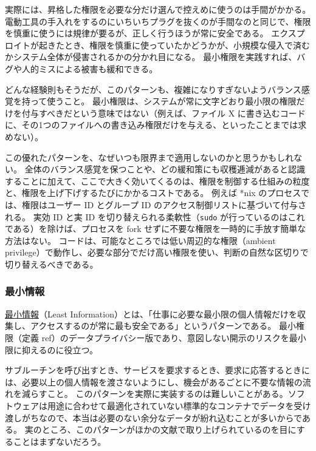 \documentclass[uplatex]{jsarticle}
\def\ref#1{ref}%
\def\label#1{}%
\begin{document}
実際には、昇格した権限を必要な分だけ選んで控えめに使うのは手間がかかる。
電動工具の手入れをするのにいちいちプラグを抜くのが手間なのと同じで、権限を慎重に使うには規律が要るが、正しく行うほうが常に安全である。
エクスプロイトが起きたとき、権限を慎重に使っていたかどうかが、小規模な侵入で済むかシステム全体が侵害されるかの分かれ目になる。
最小権限を実践すれば、バグや人的ミスによる被害も緩和できる。

\begin{rem}[最小権限とバランス]\label{rem:ch4-least-privilege-balance}
どんな経験則もそうだが、このパターンも、複雑になりすぎないようバランス感覚を持って使うこと。
最小権限は、システムが常に文字どおり最小限の権限だけを付与すべきだという意味ではない（例えば、ファイル X に書き込むコードに、その1つのファイルへの書き込み権限だけを与える、といったことまでは求めない）。

この優れたパターンを、なぜいつも限界まで適用しないのかと思うかもしれない。
全体のバランス感覚を保つことや、どの緩和策にも収穫逓減があると認識することに加えて、ここで大きく効いてくるのは、権限を制御する仕組みの粒度と、権限を上げ下げするたびにかかるコストである。
例えば *nix のプロセスでは、権限はユーザー ID とグループ ID のアクセス制御リストに基づいて付与される。
実効 ID と実 ID を切り替えられる柔軟性（\texttt{sudo} が行っているのはこれである）を除けば、プロセスを fork せずに不要な権限を一時的に手放す簡単な方法はない。
コードは、可能なところでは低い周辺的な権限（ambient privilege）で動作し、必要な部分でだけ高い権限を使い、判断の自然な区切りで切り替えるべきである。
\end{rem}

\subsubsection{最小情報}

\begin{dfn}[最小情報]\label{dfn:ch4-least-information}
\underline{最小情報}（Least Information）とは、「仕事に必要な最小限の個人情報だけを収集し、アクセスするのが常に最も安全である」というパターンである。
最小権限（定義 \ref{dfn:ch4-least-privilege}）のデータプライバシー版であり、意図しない開示のリスクを最小限に抑えるのに役立つ。
\end{dfn}

サブルーチンを呼び出すとき、サービスを要求するとき、要求に応答するときには、必要以上の個人情報を渡さないようにし、機会があるごとに不要な情報の流れを減らすこと。
このパターンを実際に実装するのは難しいことがある。ソフトウェアは用途に合わせて最適化されていない標準的なコンテナでデータを受け渡しがちなので、本当は必要のない余分なデータが紛れ込むことが多いからである。
実のところ、このパターンがほかの文献で取り上げられているのを目にすることはまずないだろう。
\end{document}
